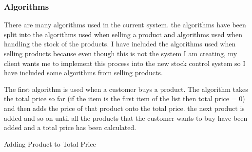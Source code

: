 \subsubsection{Algorithms}

\begin{flushleft}
There are many algorithms used in the current system. the algorithms have been split into the algorithms used when selling a product and algorithms used when handling the stock of the products. I have included the algorithms used when selling products because even though this is not the system I am creating, my client wants me to implement this process into the new stock control system so I have included some algorithms from selling products.\par

The first algorithm is used when a customer buys a product. The algorithm takes the total price so far (if the item is the first item of the list then total price = 0) and then adds the price of that product onto the total price. the next product is added and so on until all the products that the customer wants to buy have been added and a total price has been calculated. \par

\end{flushleft}

\begin{algorithm}[H]
\label{fig:repeat_pseudo_example}
\caption{Adding Product to Total Price}
\begin{algorithmic}[1]
\EndIf
\EndWhile
\end{algorithmic}
\end{algorithm}


